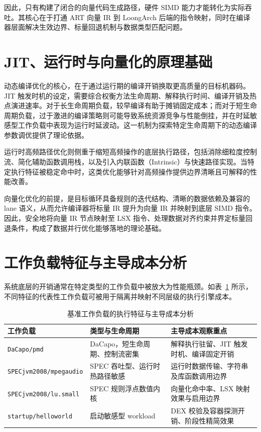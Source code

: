 因此，只有构建了闭合的向量代码生成路径，硬件 SIMD 能力才能转化为实际吞吐。其核心在于打通 ART 向量 IR 到 LoongArch 后端的指令映射，同时在编译器层面解决生效边界、标量回退机制与数据类型匹配问题。

\section{JIT、运行时与向量化的原理基础}

动态编译优化的核心，在于通过运行期的编译开销换取更高质量的目标机器码\citep{Arnold2005, Paleczny2001, Suganuma2001}。JIT 触发时机的设定，需要综合权衡方法生命周期、解释执行时间、编译开销及热点演进速率。对于长生命周期负载，较早编译有助于摊销固定成本；而对于短生命周期负载，过于激进的编译策略则可能导致系统资源竞争与性能倒挂，并在时延敏感型工作负载中表现为运行时延波动。这一机制为探索特定生命周期下的动态编译参数调优提供了理论依据。

运行时高频路径优化则侧重于缩短高频操作的底层执行路径，包括消除细粒度控制流、简化辅助函数调用栈，以及引入内联函数（Intrinsic）与快速路径实现\citep{Haubl2008OptimizedStrings, Haubl2010CompactStrings, ArtJitCompiler2024}。当特定执行特征被稳定命中时，这类优化能够针对高频操作提供边界清晰且可解释的性能改善。

向量化优化的前提，是目标循环具备规则的迭代结构、清晰的数据依赖及兼容的 lane 语义，从而允许编译器将标量 IR 提升为向量 IR 并映射到底层 SIMD 指令\citep{Nie2010VectorizationJava}。因此，安全地将向量 IR 节点映射至 LSX 指令、处理数据对齐约束并界定标量回退条件，构成了数据并行优化能够落地的理论基础。

\section{工作负载特征与主导成本分析}

系统底层的开销通常在特定类型的工作负载中被放大为性能瓶颈\citep{Blackburn2006, SPECjvm2008, Lengauer2017GCBench, Prokopec2019Renaissance}。如表~\ref{tab:workload-cost-types} 所示，不同特征的代表性工作负载可被用于隔离并映射不同层级的执行引擎成本。

\begin{table}[htbp]
    \centering
    \small
    \caption{基准工作负载的执行特征与主导成本分析}
    \label{tab:workload-cost-types}
    \begin{tabular}{p{3.5cm}p{3.2cm}p{5.4cm}}
        \hline
        \textbf{工作负载} & \textbf{类型与生命周期} & \textbf{主导成本观察重点} \\
        \hline
        \texttt{DaCapo/pmd} & DaCapo，短生命周期、控制流密集 & 解释执行驻留、JIT 触发时机、编译固定开销 \\
        \texttt{SPECjvm2008/mpegaudio} & SPEC 吞吐型、运行时热路径敏感 & 运行时数据传输、字符串及库函数调用边界 \\
        \texttt{SPECjvm2008/lu.small} & SPEC 规则浮点数值内核 & 向量化命中率、LSX 映射效果与启用边界 \\
        \texttt{startup/helloworld} & 启动敏感型 workload & DEX 校验及容器探测开销、阶段性精简效果 \\
        \hline
    \end{tabular}
\end{table}

